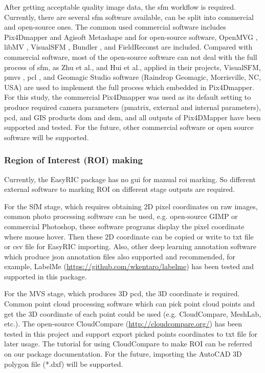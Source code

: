 \documentclass{configs/bmcart}
\begin{document}
After getting acceptable quality image data, the \acrshort*{sfm} workflow is required. Currently, there are several \acrshort*{sfm} software available, can be split into commercial and open-source ones. The common used commercial software includes Pix4Dmapper and Agisoft Metashape and for open-source software, OpenMVG \cite{openmvg_openmvg_2020}, libMV \cite{mierle_libmv_2020}, VisualSFM \cite{wu_visualsfm_2020}, Bundler \cite{snavely_bundler_2020}, and FieldReconst \cite{naro_fieldreconst_2020} are included. Compared with commercial software, most of the open-source software can not deal with the full process of \acrshort*{sfm}, as Zhu et al., \cite{zhu_quantification_2020} and Hui et al., \cite{hui_image-based_2018} applied in their projects, VisualSFM, \acrfull*{pmvs} \cite{furukawa_accurate_2010}, \acrfull*{pcl} \cite{rusu_3d_2011}, and Geomagic Studio software (Raindrop Geomagic, Morrisville, NC, USA) are used to implement the full process which embedded in Pix4Dmapper. For this study, the commercial Pix4Dmapper was used as its default setting to produce required camera parameters (pmatrix, external and internal parameters), \acrshort*{pcd}, and GIS products \acrshort*{dom} and \acrshort*{dsm}, and all outputs of Pix4DMapper have been supported and tested. For the future, other commercial software or open source software will be supported.

\subsubsection*{Region of Interest (ROI) making}
Currently, the EasyRIC package has no \acrfull*{gui} for manual \acrshort*{roi} marking. So different external software to marking ROI on different stage outputs are required.

For the SfM stage, which requires obtaining 2D pixel coordinates on raw images, common photo processing software can be used, e.g. open-source GIMP or commercial Photoshop, these software programs display the pixel coordinate where mouse hover. Then these 2D coordinate can be copied or write to txt file or csv file for EasyRIC importing. Also, other deep learning annotation software which produce json annotation files also supported and recommended, for example, LabelMe (\url{https://github.com/wkentaro/labelme}) has been tested and supported in this package.

For the MVS stage, which produces 3D \acrshort*{pcd}, the 3D coordinate is required. Common point cloud processing software which can pick point cloud points and get the 3D coordinate of each point could be used (e.g. CloudCompare, MeshLab, etc.). The open-source CloudCompare (\url{http://cloudcompare.org/}) has been tested in this project and support export picked points coordinates to txt file for later usage. The tutorial for using CloudCompare to make ROI can be referred on our package documentation. For the future, importing the AutoCAD 3D polygon file (*.dxf) will be supported.
\end{document}
